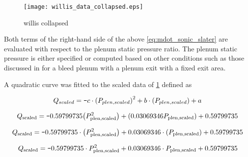 \begin{figure}[H]
 \begin{center}
    \texttt{[image: willis\_data\_collapsed.eps]}
     \caption{willis collapsed}
     \label{fig:willis_collapsed}
 \end{center}
\end{figure}



Both terms of the right-hand side of the above \cref{eq:mdot_sonic_slater} are evaluated with respect to the plenum static pressure ratio. The plenum static pressure is either specified or computed based on other conditions such as those discussed in \cite{Slater2010} for a bleed plenum with a plenum exit with a fixed exit area.

A quadratic curve was fitted to the scaled data of \cref{fig:willis_collapsed} defined as

$$ Q_{scaled} = \texttt{-} c \cdot \qty(P_{plen, scaled})^2 + b\cdot \qty(P_{plen, scaled}) + a$$

$$ Q_{\textrm{scaled}} = \texttt{-}0.59799735 \qty(P_{\textrm{plen,scaled}}^2) + \qty(0.03069346P_{\textrm{plen,scaled}}) + 0.59799735 $$

$$ Q_{\textrm{scaled}} = \texttt{-}0.59799735 \cdot \qty(P_{\textrm{plen,scaled}}^2) + 0.03069346 \cdot \qty(P_{\textrm{plen,scaled}}) + 0.59799735 $$

\begin{equation} Q_{\textrm{scaled}} = \texttt{-}0.59799735 \cdot P_{\textrm{plen,scaled}}^2 + 0.03069346 \cdot P_{\textrm{plen,scaled}} + 0.59799735 
	\label{eq:slater_model} \end{equation}


